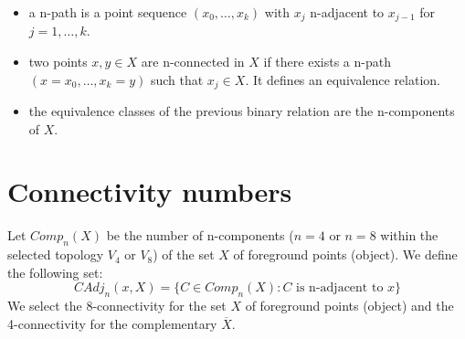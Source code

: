 \begin{itemize}
\begin{figure}[H]
{\begin{tabular}{|m{0.15cm}|m{0.15cm}|m{0.15cm}|}
\cellcolor{black}  &    & \cellcolor{black}\\ \hline
\end{tabular}
}\hfill
%
%
\vspace*{-8pt}
\end{figure}
\vspace*{-8pt}

\item a n-path is a point sequence $(x_0,\dots,x_k)$ with $x_j$ n-adjacent to $x_{j-1}$ for $j=1,\dots, k$. 
\item two points $x, y\in X$ are n-connected in $X$ if there exists a n-path $(x=x_0,\dots ,x_k=y)$ such that $x_j\in X$. It defines an equivalence relation.
\item the equivalence classes of the previous binary relation are the n-components of $X$.

\end{itemize}

\section{Connectivity numbers}
Let $Comp_n(X)$ be the number of n-components ($n=4$ or $n=8$ within the selected topology $V_4$ or $V_8$) of the set $X$ of foreground points (object). We define the following set:
$$ 
CAdj_n(x,X)=\{C\in Comp_n(X): C \text{ is n-adjacent to } x \}
$$
We select the 8-connectivity for the set $X$ of foreground points (object) and the 4-connectivity for the complementary $\overline{X}$.

